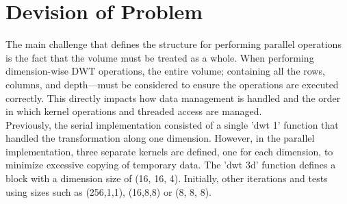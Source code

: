 \documentclass[journal,11pt]{IEEEtran}
\begin{document}
\section{Devision of Problem}

The main challenge that defines the structure for performing parallel operations is the fact that the volume must be treated as a whole. When performing dimension-wise DWT operations, the entire volume; containing all the rows, columns, and depth—must be considered to ensure the operations are executed correctly. This directly impacts how data management is handled and the order in which kernel operations and threaded access are managed.\\

Previously, the serial implementation consisted of a single 'dwt 1' function that handled the transformation along one dimension. However, in the parallel implementation, three separate kernels are defined, one for each dimension, to minimize excessive copying of temporary data. The 'dwt 3d' function defines a block with a dimension size of (16, 16, 4). Initially, other iterations and tests using sizes such as (256,1,1), (16,8,8) or (8, 8, 8). 
\end{document}
